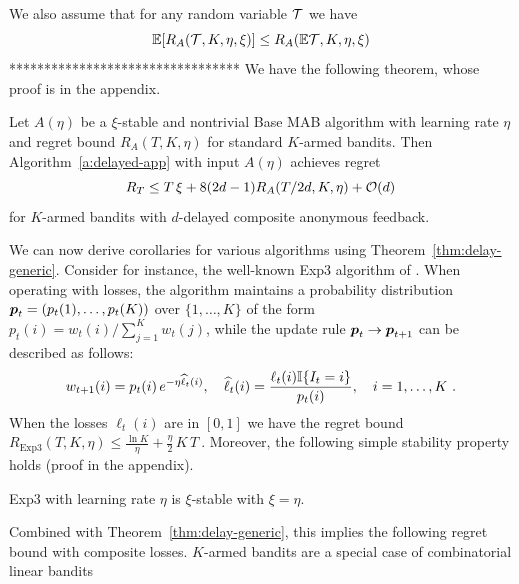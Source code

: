 We also assume that for any random variable ${\cal T}$ we have
\[
\mathbb{E}[R_A({\cal T},K,\eta,\xi)]\leq R_A(\mathbb{E}{\cal T},K,\eta,\xi)
\]
*********************************
\fi
We have the following theorem, whose proof is in the appendix.
%
\begin{theorem}\label{thm:delay-generic}
Let $A(\eta)$ be a $\xi$-stable and nontrivial Base MAB algorithm with learning rate $\eta$ and regret bound
$R_A(T,K,\eta)$ for standard $K$-armed bandits. Then
Algorithm~\ref{a:delayed-app} with input $A(\eta)$ achieves regret
\[
R_T \le T\,\xi + 8(2d-1)R_A(T/2d,K,\eta) + \mathcal{O}(d)
\]
for $K$-armed bandits with $d$-delayed composite anonymous feedback.
\end{theorem}
%
%
%
We can now derive corollaries for various algorithms using Theorem~\ref{thm:delay-generic}. Consider for instance, the well-known
Exp3 algorithm of \citet{AuerCeFrSc02}. When operating with losses, the algorithm maintains a probability distribution
$\boldsymbol{p}_t = (p_t(1),\ldots,p_t(K))$ over $\{1,\ldots,K\}$ of the form $p_t(i) = w_t(i)/\sum_{j=1}^K w_t(j)$, while the update rule
$\boldsymbol{p}_t\rightarrow \boldsymbol{p}_{t+1} $ can be described as follows:
\begin{equation}
\label{eq:expW}
w_{t+1}(i) = p_t(i)\,e^{-\eta\widehat{\ell}_t(i)},\quad \widehat{\ell}_t(i) = \frac{\ell_t(i)\mathbb{I}{\left\{I_t = i\right\}}}{p_t(i)},\quad i = 1, \ldots, K~.
\end{equation}
When the losses $\ell_t(i)$ are in $[0,1]$ we have the regret bound
\(
R_{\mathrm{Exp3}}(T,K,\eta) \leq \frac{\ln K}{\eta}+\frac{\eta}{2}\,K\,T~.
\)
Moreover, the following simple stability property holds (proof in the appendix).
%
\begin{lemma}\label{l:stabilityexp3}
Exp3 with learning rate $\eta$ is $\xi$-stable with $\xi = \eta$.
\end{lemma}
%
Combined with Theorem~\ref{thm:delay-generic}, this implies the following regret bound with composite losses.
%
%
$K$-armed bandits are a special case of combinatorial linear bandits
